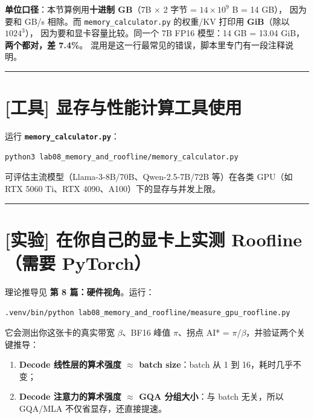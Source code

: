 \begin{noteBox}[核心导读与背景]
\textbf{单位口径}：本节算例用\textbf{十进制 GB}（7B $\times$ 2 字节 = $14 \times 10^9$ B = 14 GB），
因为要和 GB/s 相除。而 \texttt{memory\_calculator.py} 的权重/KV 打印用 \textbf{GiB}（除以 $1024^3$），
因为要和显卡容量比较。同一个 7B FP16 模型：14 GB = 13.04 GiB，\textbf{两个都对，差 7.4\%}。
混用是这一行最常见的错误，脚本里专门有一段注释说明。
\end{noteBox}

\vspace{0.8em}\hrule\vspace{0.8em}

\section{[工具] 显存与性能计算工具使用}

运行 \textbf{\texttt{memory\_calculator.py}}：

\begin{lstlisting}[language=bash]
python3 lab08_memory_and_roofline/memory_calculator.py
\end{lstlisting}

可评估主流模型（Llama-3-8B/70B、Qwen-2.5-7B/72B 等）在各类 GPU（如 RTX 5060 Ti、RTX 4090、A100）下的显存与并发上限。

\vspace{0.8em}\hrule\vspace{0.8em}

\section{[实验] 在你自己的显卡上实测 Roofline（需要 PyTorch）}

理论推导见 \textbf{第 8 篇：硬件视角}。运行：

\begin{lstlisting}[language=bash]
.venv/bin/python lab08_memory_and_roofline/measure_gpu_roofline.py
\end{lstlisting}

它会测出你这张卡的真实带宽 $\beta$、BF16 峰值 $\pi$、拐点 AI* = $\pi$/$\beta$，并验证两个关键推导：
\begin{enumerate}
  \item \textbf{Decode 线性层的算术强度 $\approx$ batch size}：batch 从 1 到 16，耗时几乎不变；
  \item \textbf{Decode 注意力的算术强度 $\approx$ GQA 分组大小}：与 batch 无关，所以 GQA/MLA 不仅省显存，还直接提速。
\end{enumerate}

